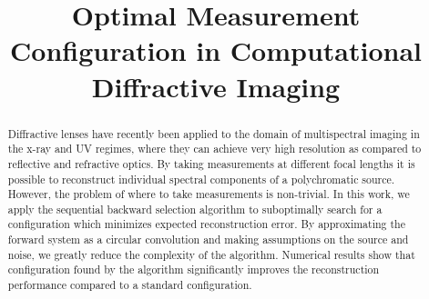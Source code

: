 \documentclass{article}
\title{Optimal Measurement Configuration in Computational \\ Diffractive Imaging}
\begin{document}
\maketitle

\begin{abstract}

Diffractive lenses have recently been applied to the domain of multispectral
imaging in the x-ray and UV regimes, where they can achieve very high resolution
as compared to reflective and refractive optics. By taking measurements at
different focal lengths it is possible to reconstruct individual spectral
components of a polychromatic source. However, the problem of where to take
measurements is non-trivial. In this work, we apply the sequential backward selection
algorithm to suboptimally search for a configuration which minimizes expected
reconstruction error. By approximating the forward system as a circular
convolution and making assumptions on the source and noise, we greatly reduce
the complexity of the algorithm. Numerical results show that
configuration found by the algorithm significantly improves the reconstruction
performance compared to a standard configuration.

\end{abstract}
\end{document}
